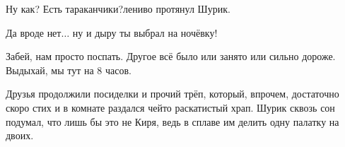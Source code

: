 \diagdash Ну как? Есть тараканчики?\mdash лениво протянул Шурик.

\diagdash Да вроде нет$\ldots$ ну и дыру ты выбрал на ночёвку! 

\diagdash Забей, нам просто поспать. Другое всё было или занято или сильно дороже. Выдыхай, мы тут на 8 часов.

Друзья продолжили посиделки и прочий трёп, который, впрочем, достаточно скоро стих и в комнате раздался чей\sdash то раскатистый храп. Шурик сквозь сон подумал, что лишь бы это не Киря, ведь в сплаве им делить одну палатку на двоих.

\begin{center}
\end{center}
